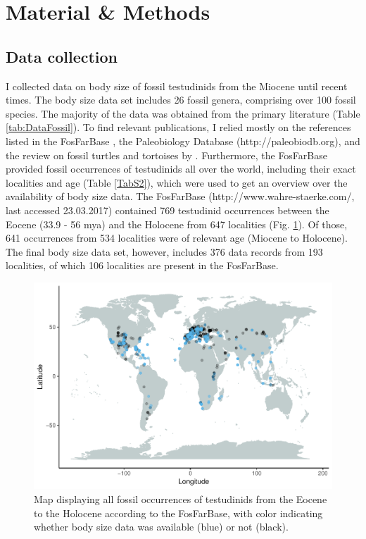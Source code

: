 \section{Material \& Methods}

\subsection{Data collection}
I collected data on body size of fossil testudinids from the Miocene until recent times. The body size data set includes 26 fossil genera, comprising over 100 fossil species. The majority of the data was obtained from the primary literature (Table \ref{tab:DataFossil}). To find relevant publications, I relied mostly on the references listed in the FosFarBase \citep{Bohme2003b}, the Paleobiology Database (http://paleobiodb.org), and the review on fossil turtles and tortoises by \cite{rhodin2015turtles}.
Furthermore, the FosFarBase provided fossil occurrences of testudinids all over the world, including their exact localities and age (Table \ref{TabS2}), which were used to get an overview over the availability of body size data. The FosFarBase (http://www.wahre-staerke.com/, last accessed 23.03.2017) contained 769 testudinid occurrences between the Eocene (33.9 - 56 mya) and the Holocene from 647 localities (Fig. \ref{fig:mapOc}). Of those, 641 occurrences from 534 localities were of relevant age (Miocene to Holocene). The final body size data set, however, includes 376 data records from 193 localities, of which 106 localities are present in the FosFarBase.


 \begin{figure}[htbp]
 	\centering
 	\includegraphics[width=\textwidth]{MA_JJ_files/figure-latex/MapFossilOccurrences-1.pdf}
 	\caption[Map: fossil occurences]{Map displaying all fossil occurrences of testudinids from the Eocene to the Holocene according to the FosFarBase, with
 		color indicating whether body size data was available (blue) or not (black).}
 	\label{fig:mapOc}
 \end{figure}

